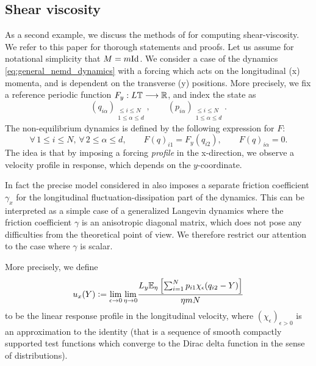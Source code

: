 \subsection{Shear viscosity}
As a second example, we discuss the methods of \cite{JS12} for computing shear-viscosity. We refer to this paper for thorough statements and proofs.
Let us assume for notational simplicity that $M=m\mathrm{Id}$.
We consider a case of the dynamics \eqref{eq:general_nemd_dynamics} with a forcing which acts on the longitudinal (x) momenta, and is dependent on the transverse (y) positions.
More precisely, we fix a reference periodic function $F_y:L\mathbb{T}\longrightarrow \mathbb{R}$,
and index the state as \[\left(q_{i\alpha}\right)_{\substack{\leq i\leq N\\1\leq \alpha\leq d}},\qquad \left(p_{i\alpha}\right)_{\substack{\leq i\leq N\\1\leq \alpha\leq d}}.\]
The non-equilibrium dynamics is defined by the following expression for $F$:
\begin{equation}
    \label{eq:shear_viscosity_forcing}
    \forall\, 1\leq i\leq N,\,\forall\, 2\leq \alpha\leq d,\qquad F(q)_{i1}=F_y(q_{i2}),\qquad F(q)_{i\alpha}=0.
\end{equation}
The idea is that by imposing a forcing \textit{profile} in the x-direction, we observe a velocity profile in response, which depends on the $y$-coordinate.
\begin{remark}
    In fact the precise model considered in \cite{JS12} also imposes a separate friction coefficient $\gamma_x$ for the longitudinal fluctuation-dissipation part of the dynamics.
    This can be interpreted as a simple case of a generalized Langevin dynamics where the friction coefficient $\gamma$ is an anisotropic diagonal matrix, which does not pose any difficulties from the theoretical point of view.
    We therefore restrict our attention to the case where $\gamma$ is scalar.
\end{remark}
More precisely, we define
\begin{equation}
    \label{eq:velocity_profile}
    u_x(Y)\mathrel{\mathop:}= \underset{\epsilon \to 0}{\lim} \, \underset{\eta \to 0}{\lim} \frac{L_y\mathbb{E}_\eta \left[\sum_{i=1}^N p_{i1}\chi_\epsilon(q_{i2}-Y)\right]}{\eta mN}
\end{equation}
to be the linear response profile in the longitudinal velocity, where $(\chi_\epsilon)_{\epsilon>0}$ is an approximation to the identity (that is a sequence of smooth compactly supported test functions which converge to the Dirac delta function in the sense of distributions).
